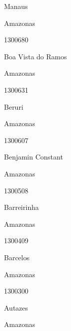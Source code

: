 \documentclass[
  letterpaper,
]{report}
\begin{document}
Manaus

\n    

\n    

\n      

Amazonas

\n      

1300680

\n      

Boa Vista do Ramos

\n    

\n    

\n      

Amazonas

\n      

1300631

\n      

Beruri

\n    

\n    

\n      

Amazonas

\n      

1300607

\n      

Benjamin Constant

\n    

\n    

\n      

Amazonas

\n      

1300508

\n      

Barreirinha

\n    

\n    

\n      

Amazonas

\n      

1300409

\n      

Barcelos

\n    

\n    

\n      

Amazonas

\n      

1300300

\n      

Autazes

\n    

\n    

\n      

Amazonas
\end{document}
